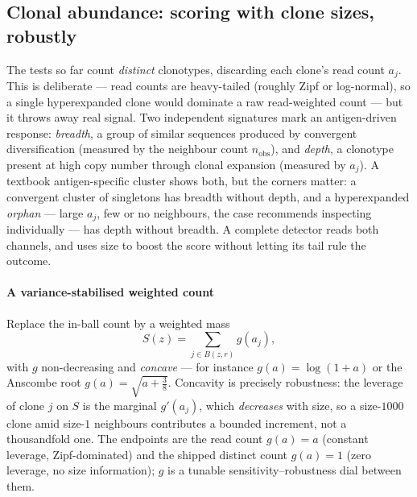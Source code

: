 \documentclass[11pt]{article}
\theoremstyle{oldplain}
\theoremstyle{oldrem}
\begin{document}
\subsection{Clonal abundance: scoring with clone sizes, robustly}\label{sec:dens-abund}

The tests so far count \emph{distinct} clonotypes, discarding each clone's read count $a_j$. This is
deliberate --- read counts are heavy-tailed (roughly Zipf or log-normal), so a single hyperexpanded clone
would dominate a raw read-weighted count --- but it throws away real signal. Two independent signatures mark
an antigen-driven response: \emph{breadth}, a group of similar sequences produced by convergent
diversification (measured by the neighbour count $n_{\mathrm{obs}}$), and \emph{depth}, a clonotype present at
high copy number through clonal expansion (measured by $a_j$). A textbook antigen-specific cluster shows both,
but the corners matter: a convergent cluster of singletons has breadth without depth, and a hyperexpanded
\emph{orphan} --- large $a_j$, few or no neighbours, the case \cite{PogorelyyShugay2019} recommends inspecting
individually --- has depth without breadth. A complete detector reads both channels, and uses size to boost
the score without letting its tail rule the outcome.

\paragraph{A variance-stabilised weighted count} Replace the in-ball count by a weighted mass
\begin{equation}\label{eq:weighted}
  S(z)=\sum_{j\in B(z,r)} g(a_j),
\end{equation}
with $g$ non-decreasing and \emph{concave} --- for instance $g(a)=\log(1+a)$ or the Anscombe root
$g(a)=\sqrt{a+\tfrac38}$. Concavity is precisely robustness: the leverage of clone $j$ on $S$ is the marginal
$g'(a_j)$, which \emph{decreases} with size, so a size-$1000$ clone amid size-$1$ neighbours contributes a
bounded increment, not a thousandfold one. The endpoints are the read count $g(a)=a$ (constant leverage,
Zipf-dominated) and the shipped distinct count $g(a)=1$ (zero leverage, no size information); $g$ is a tunable
sensitivity--robustness dial between them.
\end{document}
